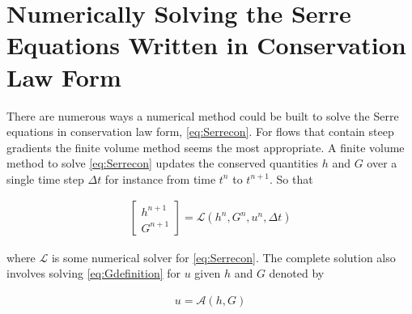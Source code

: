 \documentclass[SingleSpace,12pt]{Serre_ASCE}
\begin{document}
\section{Numerically Solving the Serre Equations Written in Conservation Law Form}
\label{section:Solving the Serre Equations Written in Conservation Law Form}
There are numerous ways a numerical method could be built to solve the Serre equations in conservation law form, \eqref{eq:Serrecon}. For flows that contain steep gradients the finite volume method seems the most appropriate. A finite volume method to solve \eqref{eq:Serrecon} updates the conserved quantities $h$ and $G$ over a single time step $\Delta t$ for instance from time $t^n$ to $t^{n+1}$. So that
\begin{linenomath*}
\begin{gather}
\left[\begin{array}{c}
 h^{n+1} \\
 G^{n+1} \end{array}\right] = \mathcal{L}(h^{n},G^{n},u^n,\Delta t)
\label{eq:L}
\end{gather}
\end{linenomath*}
where $\mathcal{L}$ is some numerical solver for \eqref{eq:Serrecon}. The complete solution also involves solving \eqref{eq:Gdefinition} for $u$ given $h$ and $G$ denoted by 
\begin{linenomath*}
\begin{gather}
u = \mathcal{A}(h,G)
\label{eq:A}
\end{gather}
\end{linenomath*}
\end{document}
